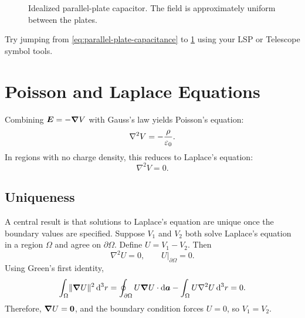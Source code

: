 \begin{figure}[h]
\centering
{}
\caption{Idealized parallel-plate capacitor. The field is approximately uniform between the plates.}
\label{fig:parallel-plate}
\end{figure}

Try jumping from \cref{eq:parallel-plate-capacitance} to \cref{fig:parallel-plate} using your LSP or Telescope symbol tools.

\newpage

\section{Poisson and Laplace Equations}
\label{sec:poisson}

Combining \(\bm{E} = -\bm{\nabla} V\) with Gauss's law yields Poisson's equation:
\begin{equation}
  \nabla^2 V = -\frac{\rho}{\varepsilon_0}.
  \label{eq:poisson}
\end{equation}
In regions with no charge density, this reduces to Laplace's equation:
\begin{equation}
  \nabla^2 V = 0.
  \label{eq:laplace}
\end{equation}

\subsection{Uniqueness}

A central result is that solutions to Laplace's equation are unique once the boundary values are specified.
Suppose \(V_1\) and \(V_2\) both solve Laplace's equation in a region \(\Omega\) and agree on \(\partial\Omega\).
Define \(U = V_1 - V_2\). Then
\begin{equation}
  \nabla^2 U = 0,
  \qquad
  U|_{\partial\Omega}=0.
\end{equation}
Using Green's first identity,
\begin{equation}
  \int_{\Omega} \lVert \bm{\nabla} U\rVert^2 \mathop{}\!\mathrm{d}^3 r
  =
  \oint_{\partial\Omega} U \bm{\nabla} U\cdot \mathop{}\!\mathrm{d}\bm{a}
  -
  \int_{\Omega} U \nabla^2 U \mathop{}\!\mathrm{d}^3 r
  =
  0.
\end{equation}
Therefore, \(\bm{\nabla} U=\bm{0}\), and the boundary condition forces \(U=0\), so \(V_1=V_2\).


